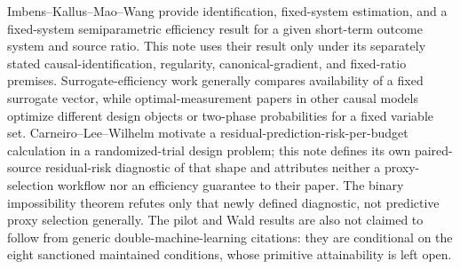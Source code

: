 Imbens--Kallus--Mao--Wang provide identification, fixed-system estimation, and a fixed-system semiparametric efficiency result for a given short-term outcome system and source ratio.  This note uses their result only under its separately stated causal-identification, regularity, canonical-gradient, and fixed-ratio premises.  Surrogate-efficiency work generally compares availability of a fixed surrogate vector, while optimal-measurement papers in other causal models optimize different design objects or two-phase probabilities for a fixed variable set.  Carneiro--Lee--Wilhelm motivate a residual-prediction-risk-per-budget calculation in a randomized-trial design problem; this note defines its own paired-source residual-risk diagnostic of that shape and attributes neither a proxy-selection workflow nor an efficiency guarantee to their paper.  The binary impossibility theorem refutes only that newly defined diagnostic, not predictive proxy selection generally.  The pilot and Wald results are also not claimed to follow from generic double-machine-learning citations: they are conditional on the eight sanctioned maintained conditions, whose primitive attainability is left open.
